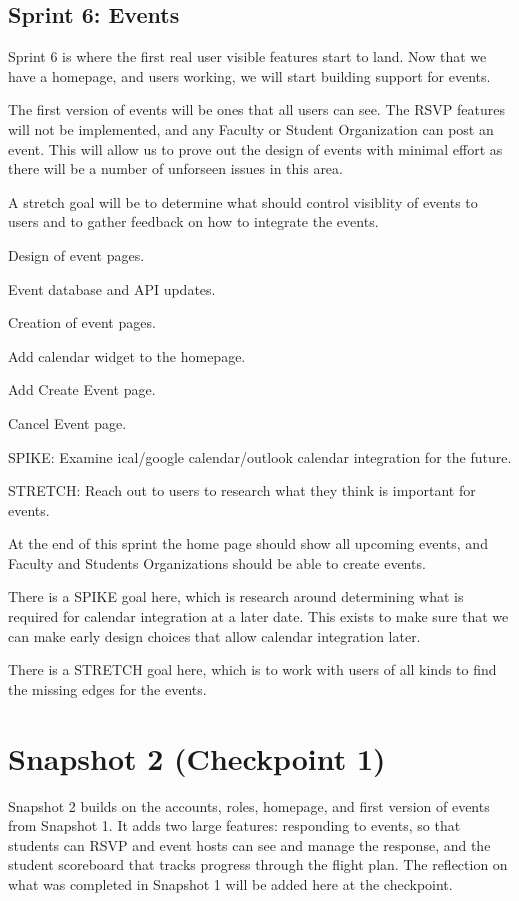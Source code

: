 \subsection {Sprint 6: Events}
Sprint 6 is where the first real user visible features start to land.
Now that we have a homepage, and users working, we will start building support for events.

The first version of events will be ones that all users can see.
The RSVP features will not be implemented, and any Faculty or Student Organization can post an event.
This will allow us to prove out the design of events with minimal effort as there will be a number of unforseen issues in this area.

A stretch goal will be to determine what should control visiblity of events to users and to gather feedback on how to integrate the events.

	\begin{todolist}[leftmargin=3\parindent]
		\item Design of event pages.
		\item Event database and API updates.
		\item Creation of event pages.
		\item Add calendar widget to the homepage.
		\item Add Create Event page.
		\item Cancel Event page.
		\item SPIKE: Examine ical/google calendar/outlook calendar integration for the future.
		\item STRETCH: Reach out to users to research what they think is important for events.
	\end{todolist}

At the end of this sprint the home page should show all upcoming events, and Faculty and Students Organizations should be able to create events.

There is a SPIKE goal here, which is research around determining what is required for calendar integration at a later date. This exists to make sure that we can make early design choices that allow calendar integration later.

There is a STRETCH goal here, which is to work with users of all kinds to find the missing edges for the events.

\newpage %


\newpage %
\section {Snapshot 2 (Checkpoint 1)}
Snapshot 2 builds on the accounts, roles, homepage, and first version of events from Snapshot 1.
It adds two large features: responding to events, so that students can RSVP and event hosts can see and manage the response, and the student scoreboard that tracks progress through the flight plan.
The reflection on what was completed in Snapshot 1 will be added here at the checkpoint.

